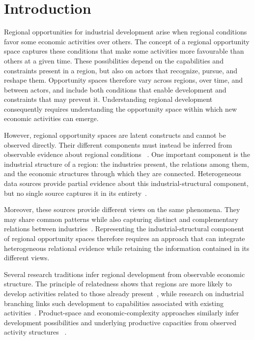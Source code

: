 \documentclass[9pt,twocolumn,twoside]{pnas-new}
\begin{document}
\section{Introduction}
Regional opportunities for industrial development arise when regional conditions favor some economic activities over others. The concept of a regional opportunity space captures these conditions that make some activities more favourable than others at a given time. These possibilities depend on the capabilities and constraints present in a region, but also on actors that recognize, pursue, and reshape them. Opportunity spaces therefore vary across regions, over time, and between actors, and include both conditions that enable development and constraints that may prevent it. Understanding regional development consequently requires understanding the opportunity space within which new economic activities can emerge. \cite{grillitschTrinityChangeAgency2020,kurikkaRegionalOpportunitySpaces2023,grillitschPatternsOpportunitySpaces2025,boschmaRelatednessDriverRegional2017}

However, regional opportunity spaces are latent constructs and cannot be observed directly. Their different components must instead be inferred from observable evidence about regional conditions ~\cite{hidalgoBuildingBlocksEconomic2009}. One important component is the industrial structure of a region: the industries present, the relations among them, and the economic structures through which they are connected. \Parasplit Heterogeneous data sources provide partial evidence about this industrial-structural component, but no single source captures it in its entirety~\cite{neffkeSkillRelatednessFirm2013,diodatoWhyIndustriesCoagglomerate2018,hobergTextBasedNetworkIndustries2016}.

Moreover, these sources provide different views on the same phenomena. They may share common patterns while also capturing distinct and complementary relations between industries~\cite{diodatoWhyIndustriesCoagglomerate2018,liEvaluatingPrincipleRelatedness2024,kivelaMultilayerNetworks2014}. Representing the industrial-structural component of regional opportunity spaces therefore requires an approach that can integrate heterogeneous relational evidence while retaining the information contained in its different views.

Several research traditions infer regional development from observable economic structure.
The principle of relatedness shows that regions are more likely to develop activities related
to those already present~\cite{hidalgoPrincipleRelatedness2018,hidalgoEconomicComplexityTheory2021},
while research on industrial branching links such development to capabilities associated with
existing activities~\cite{boschmaRelatednessDriverRegional2017,neffkeHowRegionsDiversify2011}.
Product-space and economic-complexity approaches similarly infer development possibilities
and underlying productive capacities from observed activity structures
~\cite{hidalgoProductSpaceConditions2007,hidalgoBuildingBlocksEconomic2009,
ballandSmartSpecializationPolicy2019}.
\end{document}
